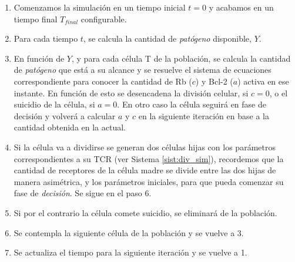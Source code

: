 \begin{enumerate}
	\item Comenzamos la simulación en un tiempo inicial $t=0$ y acabamos en un tiempo final $T_{final}$ configurable.
	
	\item Para cada tiempo $t$, se calcula la cantidad de \textit{patógeno} disponible, $Y$. 
	
	\item En función de $Y$, y para cada célula T de la población, se calcula la cantidad de \textit{patógeno} que está a su alcance y se resuelve el sistema de ecuaciones correspondiente para conocer la cantidad de Rb ($c$) y Bcl-2 ($a$) activa en ese instante. En función de esto se desencadena la división celular, si $c = 0$, o el suicidio de la célula, si $a = 0$. En otro caso la célula seguirá en fase de decisión y volverá a calcular $a$ y $c$ en la siguiente iteración en base a la cantidad obtenida en la actual.
	
	\item Si la célula va a dividirse se generan dos células hijas con los parámetros correspondientes a su TCR (ver Sistema \ref{sist:div_sim}), recordemos que la cantidad de receptores de la célula madre se divide entre las dos hijas de manera asimétrica, y los parámetros iniciales, para que pueda comenzar su fase de \textit{decisión}. Se sigue en el paso 6.
	
	\item Si por el contrario la célula comete suicidio, se eliminará de la población. 

	\item Se contempla la siguiente célula de la población y se vuelve a 3.
	
	\item Se actualiza el tiempo para la siguiente iteración y se vuelve a 1.
\end{enumerate}


